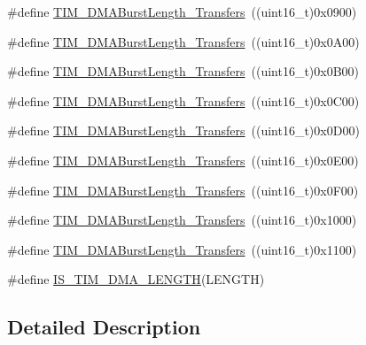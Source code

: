 \begin{DoxyCompactItemize}
\item 
\#define \mbox{\hyperlink{group___t_i_m___d_m_a___burst___length_ga2fc09f2148cf6ebddc8e67116212259c}{T\+I\+M\+\_\+\+D\+M\+A\+Burst\+Length\+\_\+Transfers}}~((uint16\+\_\+t)0x0900)
\item 
\#define \mbox{\hyperlink{group___t_i_m___d_m_a___burst___length_ga0ca63a3caeaf1e85bd54961891949de7}{T\+I\+M\+\_\+\+D\+M\+A\+Burst\+Length\+\_\+Transfers}}~((uint16\+\_\+t)0x0\+A00)
\item 
\#define \mbox{\hyperlink{group___t_i_m___d_m_a___burst___length_ga9160d52913bbd7ad1e663ff943d01852}{T\+I\+M\+\_\+\+D\+M\+A\+Burst\+Length\+\_\+Transfers}}~((uint16\+\_\+t)0x0\+B00)
\item 
\#define \mbox{\hyperlink{group___t_i_m___d_m_a___burst___length_ga11485e9eee8a6a7edc1df868755eab85}{T\+I\+M\+\_\+\+D\+M\+A\+Burst\+Length\+\_\+Transfers}}~((uint16\+\_\+t)0x0\+C00)
\item 
\#define \mbox{\hyperlink{group___t_i_m___d_m_a___burst___length_gab1a097ca7404e518839df99795443fb0}{T\+I\+M\+\_\+\+D\+M\+A\+Burst\+Length\+\_\+Transfers}}~((uint16\+\_\+t)0x0\+D00)
\item 
\#define \mbox{\hyperlink{group___t_i_m___d_m_a___burst___length_gad13373f5fd246557a4fc487dc43c37ec}{T\+I\+M\+\_\+\+D\+M\+A\+Burst\+Length\+\_\+Transfers}}~((uint16\+\_\+t)0x0\+E00)
\item 
\#define \mbox{\hyperlink{group___t_i_m___d_m_a___burst___length_gafb644e6033f7b46c602b02754b69fde0}{T\+I\+M\+\_\+\+D\+M\+A\+Burst\+Length\+\_\+Transfers}}~((uint16\+\_\+t)0x0\+F00)
\item 
\#define \mbox{\hyperlink{group___t_i_m___d_m_a___burst___length_ga5b2c97f650a3c1726965187d852b8cc5}{T\+I\+M\+\_\+\+D\+M\+A\+Burst\+Length\+\_\+Transfers}}~((uint16\+\_\+t)0x1000)
\item 
\#define \mbox{\hyperlink{group___t_i_m___d_m_a___burst___length_gaed9f2afef174079f6eb6927abd995b9b}{T\+I\+M\+\_\+\+D\+M\+A\+Burst\+Length\+\_\+Transfers}}~((uint16\+\_\+t)0x1100)
\item 
\#define \mbox{\hyperlink{group___t_i_m___d_m_a___burst___length_gafd09cf0887b01a15101ba7dd6e2b4ba7}{I\+S\+\_\+\+T\+I\+M\+\_\+\+D\+M\+A\+\_\+\+L\+E\+N\+G\+TH}}(L\+E\+N\+G\+TH)
\end{DoxyCompactItemize}


\subsection{Detailed Description}


